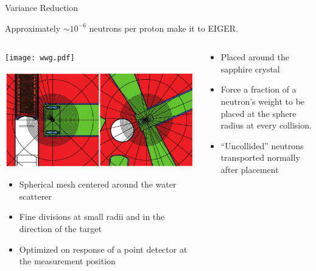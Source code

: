\documentclass[final,t]{beamer}
\begin{document}
\begin{frame}{}
\begin{columns}[t]
    \begin{column}{.3\linewidth}

      \begin{block}{Variance Reduction}

      \begin{center} Approximately $\sim 10^{-6}$ neutrons per proton make it to EIGER. \end{center}

      \begin{columns}

      \begin{column}{0.5\linewidth}

      \begin{center}
      \texttt{[image: wwg.pdf]}

      \includegraphics*[width=\linewidth]{wwg_mesh.pdf}
      \end{center}

      \begin{itemize}
      \item Spherical mesh centered around the water scatterer 
      \item Fine divisions at small radii and in the direction of the target 
      \item Optimized on response of a point detector at the measurement position
      \end{itemize}

      \end{column}


      \begin{column}{0.5\linewidth}

      \begin{itemize}
      \item Placed around the sapphire crystal 
      \item Force a fraction of a neutron's weight to be placed at the sphere radius at every collision.
      \item ``Uncollided'' neutrons transported normally after placement \cite{mcnpx270}
      \end{itemize}


\end{column}
\end{columns}
\end{block}
\end{column}
\end{columns}
\end{frame}
\end{document}
